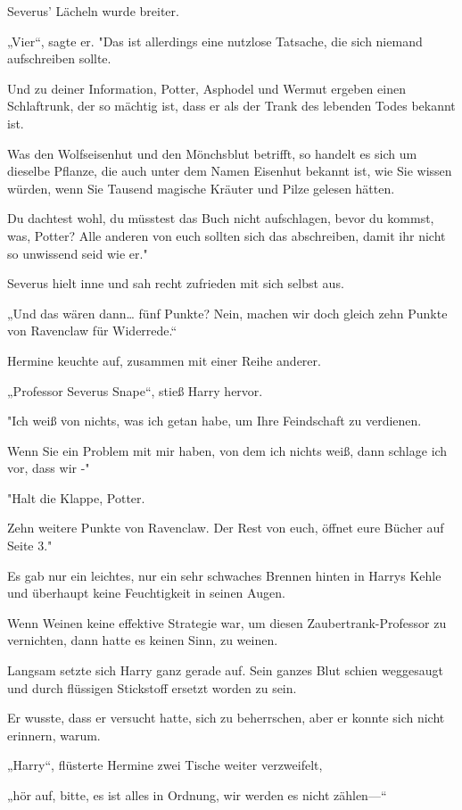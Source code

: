 {Severus' Lächeln wurde breiter.

„Vier“, sagte er. "Das ist allerdings eine nutzlose Tatsache, die sich niemand aufschreiben sollte.

Und zu deiner Information, Potter, Asphodel und Wermut ergeben einen Schlaftrunk, der so mächtig ist, dass er als der Trank des lebenden Todes bekannt ist.

Was den Wolfseisenhut und den Mönchsblut betrifft, so handelt es sich um dieselbe Pflanze, die auch unter dem Namen Eisenhut bekannt ist, wie Sie wissen würden, wenn Sie Tausend magische Kräuter und Pilze gelesen hätten.

Du dachtest wohl, du müsstest das Buch nicht aufschlagen, bevor du kommst, was, Potter? Alle anderen von euch sollten sich das abschreiben, damit ihr nicht so unwissend seid wie er."

Severus hielt inne und sah recht zufrieden mit sich selbst aus.

„Und das wären dann… fünf Punkte? Nein, machen wir doch gleich zehn Punkte von Ravenclaw für Widerrede.“

Hermine keuchte auf, zusammen mit einer Reihe anderer.

„Professor Severus Snape“, stieß Harry hervor.

"Ich weiß von nichts, was ich getan habe, um Ihre Feindschaft zu verdienen.

Wenn Sie ein Problem mit mir haben, von dem ich nichts weiß, dann schlage ich vor, dass wir -"

"Halt die Klappe, Potter.

Zehn weitere Punkte von Ravenclaw. Der Rest von euch, öffnet eure Bücher auf Seite 3."

Es gab nur ein leichtes, nur ein sehr schwaches Brennen hinten in Harrys Kehle und überhaupt keine Feuchtigkeit in seinen Augen.

Wenn Weinen keine effektive Strategie war, um diesen Zaubertrank-Professor zu vernichten, dann hatte es keinen Sinn, zu weinen.

Langsam setzte sich Harry ganz gerade auf. Sein ganzes Blut schien weggesaugt und durch flüssigen Stickstoff ersetzt worden zu sein.

Er wusste, dass er versucht hatte, sich zu beherrschen, aber er konnte sich nicht erinnern, warum.

„Harry“, flüsterte Hermine zwei Tische weiter verzweifelt,

„hör auf, bitte, es ist alles in Ordnung, wir werden es nicht zählen—“

}
